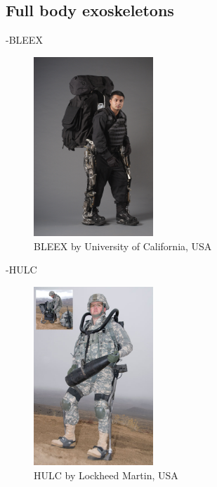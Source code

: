 \documentclass[letterpaper, 10 pt, conference]{ieeeconf}  %
\begin{document}
\subsection{Full body exoskeletons}

-BLEEX


\begin{figure}[H]
  \centering
    \includegraphics[width=0.4\textwidth]{img/bleex}
  \caption{BLEEX by University of California, USA}
\end{figure}


-HULC


\begin{figure}[H]
  \centering
    \includegraphics[width=0.4\textwidth]{img/hulc}
  \caption{HULC by Lockheed Martin, USA}
\end{figure}
\end{document}
